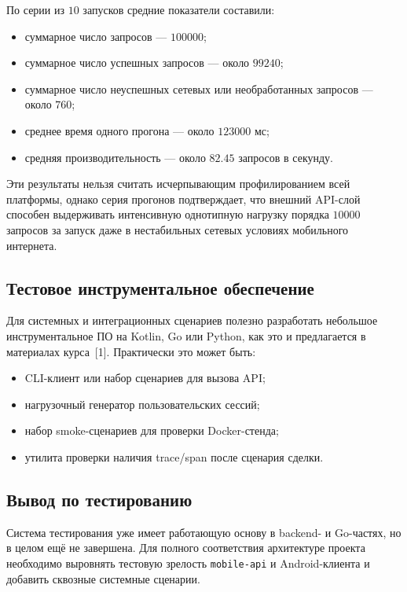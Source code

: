 \documentclass[12pt,a4paper]{article}
\begin{document}
По серии из \(10\) запусков средние показатели составили:

\begin{itemize}[leftmargin=1.2cm]
    \item суммарное число запросов --- \(100000\);
    \item суммарное число успешных запросов --- около \(99240\);
    \item суммарное число неуспешных сетевых или необработанных запросов --- около \(760\);
    \item среднее время одного прогона --- около \(123000\) мс;
    \item средняя производительность --- около \(82.45\) запросов в секунду.
\end{itemize}

Эти результаты нельзя считать исчерпывающим профилированием всей платформы, однако серия прогонов подтверждает, что внешний API-слой способен выдерживать интенсивную однотипную нагрузку порядка \(10000\) запросов за запуск даже в нестабильных сетевых условиях мобильного интернета.

\subsection{Тестовое инструментальное обеспечение}

Для системных и интеграционных сценариев полезно разработать небольшое инструментальное ПО на Kotlin, Go или Python, как это и предлагается в материалах курса~[1]. Практически это может быть:

\begin{itemize}[leftmargin=1.2cm]
    \item CLI-клиент или набор сценариев для вызова API;
    \item нагрузочный генератор пользовательских сессий;
    \item набор smoke-сценариев для проверки Docker-стенда;
    \item утилита проверки наличия trace/span после сценария сделки.
\end{itemize}

\subsection{Вывод по тестированию}

Система тестирования уже имеет работающую основу в backend- и Go-частях, но в целом ещё не завершена. Для полного соответствия архитектуре проекта необходимо выровнять тестовую зрелость \texttt{mobile-api} и Android-клиента и добавить сквозные системные сценарии.
\end{document}

